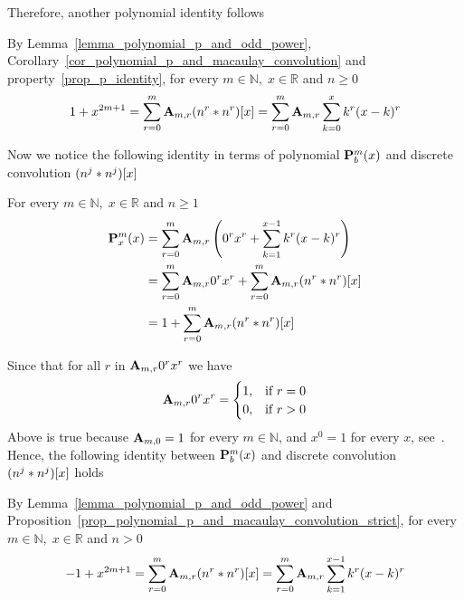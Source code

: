 Therefore, another polynomial identity follows
\begin{thm}
    \label{thm_odd_power_by_macaulays_convolution}
    By Lemma~\ref{lemma_polynomial_p_and_odd_power}, Corollary~\ref{cor_polynomial_p_and_macaulay_convolution}
    and property~\ref{prop_p_identity}, for every $m\in\mathbb{N}, \; x\in\mathbb{R}$ and $n\geq 0$
    \begin{align*}
        1 + x^{2m+1} = \sum_{r=0}^{m} {\mathbf{A}} \sb{m,r} (n \sp{r} \ast n \sp{r}) [x]
                     = \sum_{r=0}^{m} {\mathbf{A}} \sb{m,r} \sum_{k=0}^{x} k^r (x-k)^r
    \end{align*}
\end{thm}
Now we notice the following identity in terms of polynomial ${\mathbf{P}}\sp{m} \sb{b}(x)$ and
discrete convolution $(n \sp{j} \ast n \sp{j}) [x]$
\begin{prop}
    \label{prop_polynomial_p_and_macaulay_convolution_strict}
    For every $m \in \mathbb{N}, \; x\in\mathbb{R}$ and $n \geq 1$
    \begin{equation*}
        \begin{split}
            {\mathbf{P}}\sp{m} \sb{x}(x)
            &=\sum_{r=0}^{m} {\mathbf{A}} \sb{m,r} \left(0^r x^r + \sum_{k=1}^{x-1} k^r (x-k)^r \right) \\
            &=\sum_{r=0}^{m} {\mathbf{A}} \sb{m,r} 0^r x^r + \sum_{r=0}^{m} {\mathbf{A}} \sb{m,r} (n \sp{r} \ast n \sp{r}) [x] \\
            &=1 + \sum_{r=0}^{m} {\mathbf{A}} \sb{m,r} (n \sp{r} \ast n \sp{r}) [x]
        \end{split}
    \end{equation*}
\end{prop}
Since that for all $r$ in ${\mathbf{A}} \sb{m,r} 0^r x^r$ we have
\begin{equation*}
    {\mathbf{A}} \sb{m,r} 0^r x^r =
    \begin{cases}
        1, & \mbox{if } r=0 \\
        0, & \mbox{if } r>0
    \end{cases}
\end{equation*}
Above is true because ${\mathbf{A}} \sb{m,0}=1$ for every $m\in\mathbb{N}$, and $x^0 = 1$
for every $x$, see~\cite{graham1994concrete}.
Hence, the following identity between ${\mathbf{P}}\sp{m} \sb{b}(x)$ and
discrete convolution $(n \sp{j} \ast n \sp{j}) [x]$ holds
\begin{thm}
    \label{thm_odd_power_by_macaulays_convolution_strict}
    By Lemma~\ref{lemma_polynomial_p_and_odd_power} and
    Proposition~\ref{prop_polynomial_p_and_macaulay_convolution_strict},
    for every $m\in\mathbb{N}, \; x\in\mathbb{R}$ and $n > 0$
    \begin{equation*}
        -1 + x^{2m+1} = \sum_{r=0}^{m} {\mathbf{A}} \sb{m,r} (n \sp{r} \ast n \sp{r}) [x]
                      = \sum_{r=0}^{m} {\mathbf{A}} \sb{m,r} \sum_{k=1}^{x-1} k^r (x-k)^r
    \end{equation*}
\end{thm}
